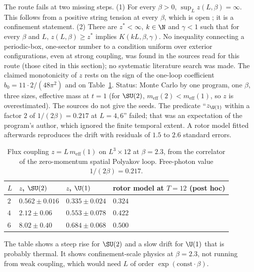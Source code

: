 \begin{observation}\label{neg:obs-fs}
The route fails at two missing steps.
\textup{(1)} For every $\beta>0$, $\sup_Lz(L,\beta)=\infty$. This follows from a positive string
tension at every $\beta$, which is open \cite{Ch21}; it is a confinement statement.
\textup{(2)} There are $z^*<\infty$, $k\in\N$ and $\gamma<1$ such that for every $\beta$ and $L$,
$z(L,\beta)\ge z^*$ implies $K(kL,\beta,\gamma)$. No inequality connecting a periodic-box,
one-sector number to a condition uniform over exterior configurations, even at strong coupling,
was found in the sources read for this route (those cited in this section); no systematic
literature search was made.
The claimed monotonicity of $z$ rests on the sign of the one-loop coefficient
$b_0=11\cdot2/(48\pi^2)$ and on Table~\ref{neg:tab-fs}. Status: Monte Carlo by one program, one
$\beta$, three sizes, effective mass at $t=1$ (for $\SU(2)$, $m_{\mathrm{eff}}(2)<m_{\mathrm{eff}}(1)$,
so $z$ is overestimated). The sources do not give the seeds. The predicate ``$z_{\U(1)}$ within a
factor $2$ of $1/(2\beta)=0.217$ at $L=4,6$'' failed; that was an expectation of the program's
author, which ignored the finite temporal extent. A rotor model fitted afterwards reproduces the drift with
residuals of $1.5$ to $2.6$ standard errors.
\end{observation}

\begin{table}[ht]
\centering
\small
\begin{tabular}{@{}llll@{}}
\toprule
$L$ & $z$, $\SU(2)$ & $z$, $\U(1)$ & rotor model at $T=12$ (post hoc) \\
\midrule
$2$ & $0.562\pm0.016$ & $0.335\pm0.024$ & $0.324$ \\
$4$ & $2.12\pm0.06$ & $0.553\pm0.078$ & $0.422$ \\
$6$ & $8.02\pm0.40$ & $0.684\pm0.068$ & $0.500$ \\
\bottomrule
\end{tabular}
\caption{Flux coupling $z=L\,m_{\mathrm{eff}}(1)$ on $L^3\times12$ at $\beta=2.3$, from the
correlator of the zero-momentum spatial Polyakov loop. Free-photon value $1/(2\beta)=0.217$.}
\label{neg:tab-fs}
\end{table}

The table shows a steep rise for $\SU(2)$ and a slow drift for $\U(1)$ that is probably thermal.
It shows confinement-scale physics at $\beta=2.3$, not running from weak coupling, which would
need $L$ of order $\exp(\mathrm{const}\cdot\beta)$.

